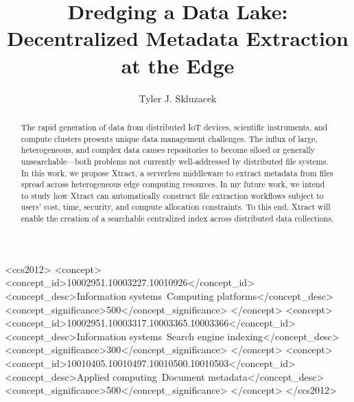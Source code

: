 \documentclass[sigconf, 9pt]{acmart}
\newcommand{\name}{Xtract}
\begin{document}
\title{Dredging a Data Lake: \\Decentralized Metadata Extraction at the Edge}

\author{Tyler J. Skluzacek} 


\renewcommand{\shortauthors}{Skluzacek et al.}

\begin{abstract}

The rapid generation of data from distributed IoT devices, scientific instruments, and compute clusters presents
unique data management challenges. The influx of large, heterogeneous, and complex data causes repositories to become 
siloed or generally unsearchable---both problems not currently well-addressed by distributed file systems.  
In this work, we propose \name{}, a serverless middleware 
to extract metadata from files spread across heterogeneous edge computing resources. 
In my future work, we intend to study how \name{} can
automatically construct file extraction workflows subject to 
users' cost, time, security, and compute allocation constraints. 
To this end, \name{} will enable the creation of a searchable centralized index across distributed data collections.


\end{abstract}

\begin{CCSXML}
<ccs2012>
<concept>
<concept_id>10002951.10003227.10010926</concept_id>
<concept_desc>Information systems~Computing platforms</concept_desc>
<concept_significance>500</concept_significance>
</concept>
<concept>
<concept_id>10002951.10003317.10003365.10003366</concept_id>
<concept_desc>Information systems~Search engine indexing</concept_desc>
<concept_significance>300</concept_significance>
</concept>
<concept>
<concept_id>10010405.10010497.10010500.10010503</concept_id>
<concept_desc>Applied computing~Document metadata</concept_desc>
<concept_significance>500</concept_significance>
</concept>
</ccs2012>
\end{CCSXML}



\maketitle
\end{document}
